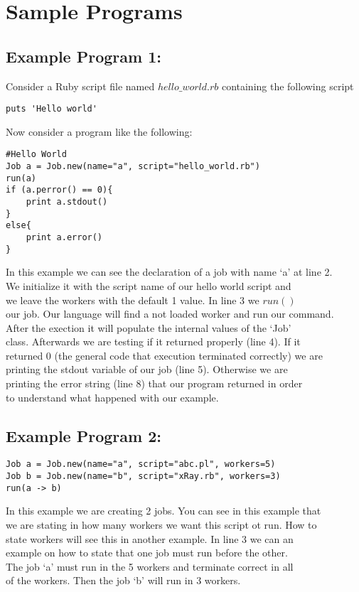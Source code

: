 \section{Sample Programs}
\label{sect:samples}
\subsection*{Example Program 1:}
Consider a Ruby script file named $hello\_world.rb$ containing the following script
\begin{verbatim}
puts 'Hello world'
\end{verbatim}
Now consider a \lang{} program like the following:
\begin{verbatim}
#Hello World
Job a = Job.new(name="a", script="hello_world.rb")
run(a)
if (a.perror() == 0){
    print a.stdout()
}
else{
    print a.error()
}
\end{verbatim}
In this example we can see the declaration of a job with name `a' at line 2.\\
We initialize it with the script name of our hello world script and\\
we leave the workers with the default 1 value. In line 3 we $run()$\\
our job. Our language will find a not loaded worker and run our command.\\
After the exection it will populate the internal values of the `Job'\\
class. Afterwards we are testing if it returned properly (line 4). If it\\
returned 0 (the general code that execution terminated correctly) we are\\
printing the stdout variable of our job (line 5). Otherwise we are\\
printing the error string (line 8) that our program returned in order\\
to understand what happened with our example.\\

\subsection*{Example Program 2:}
\begin{verbatim}
Job a = Job.new(name="a", script="abc.pl", workers=5)
Job b = Job.new(name="b", script="xRay.rb", workers=3)
run(a -> b)
\end{verbatim}

In this example we are creating 2 jobs. You can see in this example that\\
we are stating in how many workers we want this script ot run. How to \\
state workers will see this in another example. In line 3 we can an\\
example on how to state that one job must run before the other.\\
The job `a' must run in the 5 workers and terminate correct in all\\
of the workers. Then the job `b' will run in 3 workers.
\\

